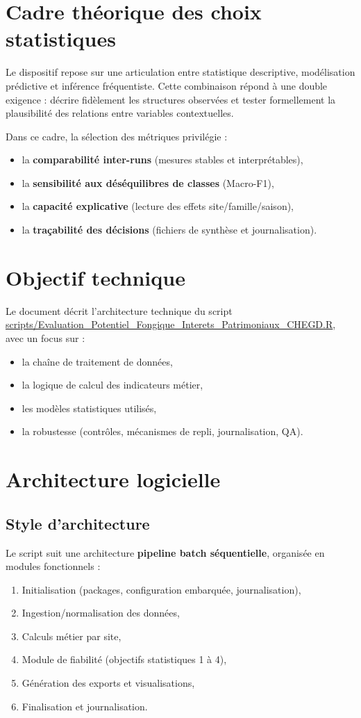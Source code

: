 \documentclass[11pt,a4paper]{article}
\begin{document}
\section{Cadre théorique des choix statistiques}
Le dispositif repose sur une articulation entre statistique descriptive,
modélisation prédictive et inférence fréquentiste. Cette combinaison répond
à une double exigence : décrire fidèlement les structures observées et tester
formellement la plausibilité des relations entre variables contextuelles.

Dans ce cadre, la sélection des métriques privilégie :
\begin{itemize}[leftmargin=1.2cm]
  \item la \textbf{comparabilité inter-runs} (mesures stables et interprétables),
  \item la \textbf{sensibilité aux déséquilibres de classes} (Macro-F1),
  \item la \textbf{capacité explicative} (lecture des effets site/famille/saison),
  \item la \textbf{traçabilité des décisions} (fichiers de synthèse et journalisation).
\end{itemize}

\section{Objectif technique}
Le document décrit l'architecture technique du script
\url{scripts/Evaluation_Potentiel_Fongique_Interets_Patrimoniaux_CHEGD.R},
avec un focus sur :
\begin{itemize}[leftmargin=1.2cm]
  \item la chaîne de traitement de données,
  \item la logique de calcul des indicateurs métier,
  \item les modèles statistiques utilisés,
  \item la robustesse (contrôles, mécanismes de repli, journalisation, QA).
\end{itemize}

\section{Architecture logicielle}
\subsection{Style d'architecture}
Le script suit une architecture \textbf{pipeline batch séquentielle}, organisée en modules fonctionnels :
\begin{enumerate}[leftmargin=1.2cm]
  \item Initialisation (packages, configuration embarquée, journalisation),
  \item Ingestion/normalisation des données,
  \item Calculs métier par site,
  \item Module de fiabilité (objectifs statistiques 1 à 4),
  \item Génération des exports et visualisations,
  \item Finalisation et journalisation.
\end{enumerate}
\end{document}
